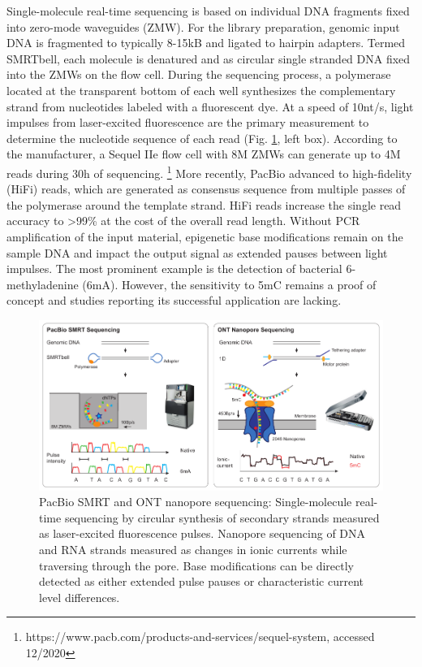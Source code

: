 Single-molecule real-time sequencing is based on individual DNA fragments fixed into zero-mode waveguides (ZMW).
For the library preparation, genomic input DNA is fragmented to typically 8-15kB and ligated to hairpin adapters.
Termed SMRTbell, each molecule is denatured and as circular single stranded DNA fixed into the ZMWs on the flow cell.
During the sequencing process, a polymerase located at the transparent bottom of each well synthesizes the complementary strand from nucleotides labeled with a fluorescent dye.
At a speed of 10nt/s, light impulses from laser-excited fluorescence are the primary measurement to determine the nucleotide sequence of each read (Fig. \ref{fig:intro:longread}, left box).
According to the manufacturer, a Sequel IIe flow cell with 8M ZMWs can generate up to 4M reads during 30h of sequencing. \footnote{https://www.pacb.com/products-and-services/sequel-system, accessed 12/2020}
More recently, PacBio advanced to high-fidelity (HiFi) reads, which are generated as consensus sequence from multiple passes of the polymerase around the template strand.
HiFi reads increase the single read accuracy to >99\% at the cost of the overall read length.
Without PCR amplification of the input material, epigenetic base modifications remain on the sample DNA and impact the output signal as extended pauses between light impulses.
The most prominent example is the detection of bacterial 6-methyladenine (6mA). 
However, the sensitivity to 5mC remains a proof of concept and studies reporting its successful application are lacking.

\begin{figure}[h]
	\centering
	\includegraphics[width=1.0\textwidth]{figures/intro/long_read.pdf}
	\captionsetup{format=plain}
	\caption[Long read sequencing]{PacBio SMRT and ONT nanopore sequencing: Single-molecule real-time sequencing by circular synthesis of secondary strands measured as laser-excited fluorescence pulses. Nanopore sequencing of DNA and RNA strands measured as changes in ionic currents while traversing through the pore. Base modifications can be directly detected as either extended pulse pauses or characteristic current level differences.}
	\label{fig:intro:longread}
\end{figure}

